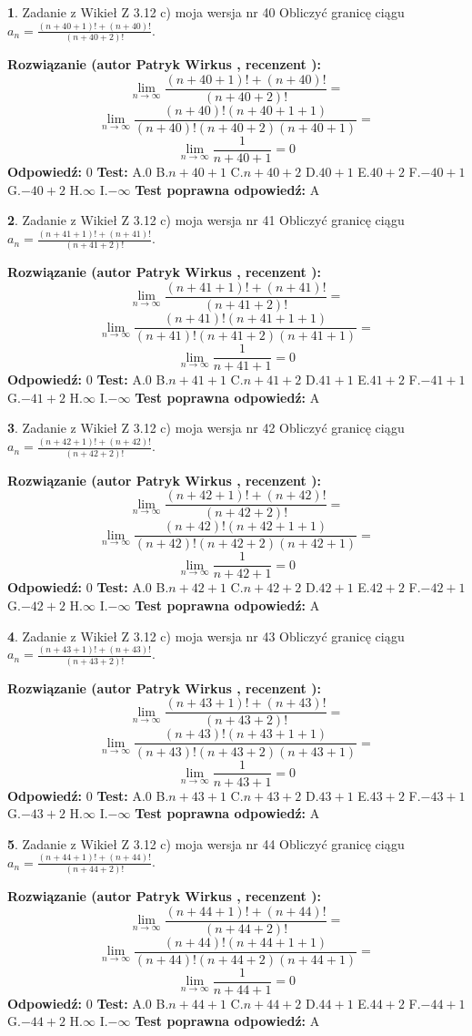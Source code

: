 \documentclass[12pt, a4paper]{article}
\theoremstyle{definition} %
\newtheorem{zad}{}
\newcommand{\zadStart}[1]{\begin{zad}#1\newline}
\newcommand{\zadStop}{\end{zad}}
\newcommand{\rozwStart}[2]{\noindent \textbf{Rozwiązanie (autor #1 , recenzent #2): }\newline}
\newcommand{\rozwStop}{\newline}
\newcommand{\odpStart}{\noindent \textbf{Odpowiedź:}\newline}
\newcommand{\odpStop}{\newline}
\newcommand{\testStart}{\noindent \textbf{Test:}\newline}
\newcommand{\testStop}{\newline}
\newcommand{\kluczStart}{\noindent \textbf{Test poprawna odpowiedź:}\newline}
\newcommand{\kluczStop}{\newline}
\begin{document}
\zadStart{Zadanie z Wikieł Z 3.12 c) moja wersja nr 40}
Obliczyć granicę ciągu $a_{n}=\frac{(n+40+1)!+(n+40)!}{(n+40+2)!}$.
\zadStop
\rozwStart{Patryk Wirkus}{}
$$\lim\limits_{n\to\infty}\frac{(n+40+1)!+(n+40)!}{(n+40+2)!}=$$
$$\lim\limits_{n\to\infty}\frac{(n+40)!(n+40+1+1)}{(n+40)!(n+40+2)(n+40+1)}=$$
$$\lim\limits_{n\to\infty}\frac{1}{n+40+1}= 0$$
\rozwStop
\odpStart
$0$
\odpStop
\testStart
A.$0$
B.$n+40+1$
C.$n+40+2$
D.$40+1$
E.$40+2$
F.$-40+1$
G.$-40+2$
H.$\infty$
I.$-\infty$
\testStop
\kluczStart
A
\kluczStop



\zadStart{Zadanie z Wikieł Z 3.12 c) moja wersja nr 41}
Obliczyć granicę ciągu $a_{n}=\frac{(n+41+1)!+(n+41)!}{(n+41+2)!}$.
\zadStop
\rozwStart{Patryk Wirkus}{}
$$\lim\limits_{n\to\infty}\frac{(n+41+1)!+(n+41)!}{(n+41+2)!}=$$
$$\lim\limits_{n\to\infty}\frac{(n+41)!(n+41+1+1)}{(n+41)!(n+41+2)(n+41+1)}=$$
$$\lim\limits_{n\to\infty}\frac{1}{n+41+1}= 0$$
\rozwStop
\odpStart
$0$
\odpStop
\testStart
A.$0$
B.$n+41+1$
C.$n+41+2$
D.$41+1$
E.$41+2$
F.$-41+1$
G.$-41+2$
H.$\infty$
I.$-\infty$
\testStop
\kluczStart
A
\kluczStop



\zadStart{Zadanie z Wikieł Z 3.12 c) moja wersja nr 42}
Obliczyć granicę ciągu $a_{n}=\frac{(n+42+1)!+(n+42)!}{(n+42+2)!}$.
\zadStop
\rozwStart{Patryk Wirkus}{}
$$\lim\limits_{n\to\infty}\frac{(n+42+1)!+(n+42)!}{(n+42+2)!}=$$
$$\lim\limits_{n\to\infty}\frac{(n+42)!(n+42+1+1)}{(n+42)!(n+42+2)(n+42+1)}=$$
$$\lim\limits_{n\to\infty}\frac{1}{n+42+1}= 0$$
\rozwStop
\odpStart
$0$
\odpStop
\testStart
A.$0$
B.$n+42+1$
C.$n+42+2$
D.$42+1$
E.$42+2$
F.$-42+1$
G.$-42+2$
H.$\infty$
I.$-\infty$
\testStop
\kluczStart
A
\kluczStop



\zadStart{Zadanie z Wikieł Z 3.12 c) moja wersja nr 43}
Obliczyć granicę ciągu $a_{n}=\frac{(n+43+1)!+(n+43)!}{(n+43+2)!}$.
\zadStop
\rozwStart{Patryk Wirkus}{}
$$\lim\limits_{n\to\infty}\frac{(n+43+1)!+(n+43)!}{(n+43+2)!}=$$
$$\lim\limits_{n\to\infty}\frac{(n+43)!(n+43+1+1)}{(n+43)!(n+43+2)(n+43+1)}=$$
$$\lim\limits_{n\to\infty}\frac{1}{n+43+1}= 0$$
\rozwStop
\odpStart
$0$
\odpStop
\testStart
A.$0$
B.$n+43+1$
C.$n+43+2$
D.$43+1$
E.$43+2$
F.$-43+1$
G.$-43+2$
H.$\infty$
I.$-\infty$
\testStop
\kluczStart
A
\kluczStop



\zadStart{Zadanie z Wikieł Z 3.12 c) moja wersja nr 44}
Obliczyć granicę ciągu $a_{n}=\frac{(n+44+1)!+(n+44)!}{(n+44+2)!}$.
\zadStop
\rozwStart{Patryk Wirkus}{}
$$\lim\limits_{n\to\infty}\frac{(n+44+1)!+(n+44)!}{(n+44+2)!}=$$
$$\lim\limits_{n\to\infty}\frac{(n+44)!(n+44+1+1)}{(n+44)!(n+44+2)(n+44+1)}=$$
$$\lim\limits_{n\to\infty}\frac{1}{n+44+1}= 0$$
\rozwStop
\odpStart
$0$
\odpStop
\testStart
A.$0$
B.$n+44+1$
C.$n+44+2$
D.$44+1$
E.$44+2$
F.$-44+1$
G.$-44+2$
H.$\infty$
I.$-\infty$
\testStop
\kluczStart
A
\kluczStop
\end{document}
